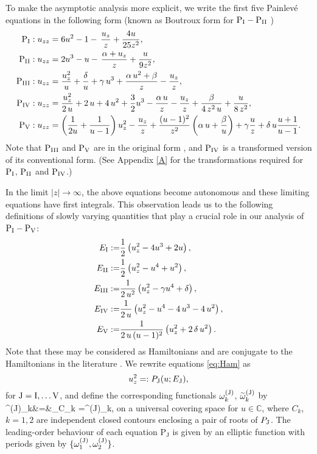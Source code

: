\documentclass[a4paper,reqno]{amsart}
\theoremstyle{definition}
\theoremstyle{remark}
\theoremstyle{theorem}
\newcommand{\pJ}{\text{P$_{\text{J}}$}}
\numberwithin{equation}{section}
\begin{document}
To make the asymptotic analysis more explicit, we write the first five Painlev\'e equations in the following form (known as Boutroux form for $\text{P$_{\text{I}}$}-\text{P$_{\text{II}}$}$ \cite{Bout13})
\begin{align}
\text{P$_{\text{I}}$}: u_{zz}&=6u^2-1-\,\frac{u_z}{z}+\frac{4u}{25 z^2},\label{p1u}\\
\text{P$_{\text{II}}$}: u_{zz}&=2u^3-u-\,\frac{\alpha+u_z}{z}+\frac{u}{9 z^2},\label{p2u}\\
\text{P$_{\text{III}}$}:  u_{zz}&=\frac{u_z^2}{u} +\frac \delta u +\gamma\, u^3 + \frac{\alpha\, u^2+\beta}{z} - \frac{u_z}z,\label{p3u}\\
\text{P$_{\text{IV}}$}:  u_{zz}&=\frac{u_z^2}{2\,u}+2\,u+4\,u^2+\frac{3}{2}u^3-\frac{\alpha\,u}{z}-\frac{u_z}{z}+\frac{\beta}{4\,z^2\,u}+\frac{u}{8\, z^2},\label{p4u}
\\
\text{P$_{\text{V}}$}:  u_{zz}&=\left(\frac{1}{2u}+\frac{1}{u-1}\right)u_z^2-\frac {u_z}{z} +\frac{(u-1)^2}{z^2}\left(\alpha\, u+\frac{\beta}{u}\right)+\gamma\frac u z+\delta\, u\frac{u+1}{u-1}.\label{p5u}
\end{align}
Note that $\text{P$_{\text{III}}$}$ and $\text{P$_{\text{V}}$}$ are in the original form \cite{G09}, and $\text{P$_{\text{IV}}$}$ is a transformed version of its conventional form. (See Appendix \ref{A} for the transformations required for $\text{P$_{\text{I}}$}$, $\text{P$_{\text{II}}$}$ and $\text{P$_{\text{IV}}$}$.)

In the limit $|z|\to\infty$, the above equations become autonomous and these limiting equations have first integrals. This observation leads us to the following definitions of slowly varying quantities that play a crucial role in our analysis of $\text{P$_{\text{I}}$}-\text{P$_{\text{V}}$}$:
\begin{subequations}\label{eq:Ham}
\begin{align}
E_{\rm I}:=&\frac12\left(u_z^2-4u^3+2u\right),\\
E_{\rm II}:=&\frac12\left(u_z^2-u^4+u^2\right),\\
E_{\rm III}:=&\frac{1}{2\,u^2}\left(u_z^2-\gamma u^4+\delta\right),\label{eq:HamIII}\\
E_{\rm IV}:=&\frac{1}{2\,u}\left(u_z^2-u^4-4\,u^3-4\,u^2\right),\\
E_{\rm V}:=&\frac{1}{2\,u\,(u-1)^2}\left(u_z^2+2\,\delta\,u^2\right).
\end{align}
\end{subequations}
Note that these may be considered as Hamiltonians and are conjugate to the Hamiltonians in the literature \cite{O80}. We rewrite equations \eqref{eq:Ham} as
\begin{equation}\label{e:uprimeJ}
u_z^2=:P_{\rm J}(u; E_{\rm J}),
\end{equation}
for $\rm J=\rm I,\ldots \rm V$, and define the corresponding functionals $\omega^{(\rm J)}_k$, $\widetilde{\omega}^{(\rm J)}_k$ by
\beq\label{periodints}
\om^{(\rm J)}_k&=&\oint_{C_k} =\omt^{(\rm J)}_k,
\eeq
on a universal covering space for $u\in\mathbb C$, where $C_k$, $k=1, 2$ are independent closed contours enclosing a pair of roots of $P_{\rm J}$. The leading-order behaviour of each equation $\pJ$ is given by an elliptic function with periods given by $\{\omega^{(\rm J)}_1, \omega^{(\rm J)}_2\}$.  
\end{document}
